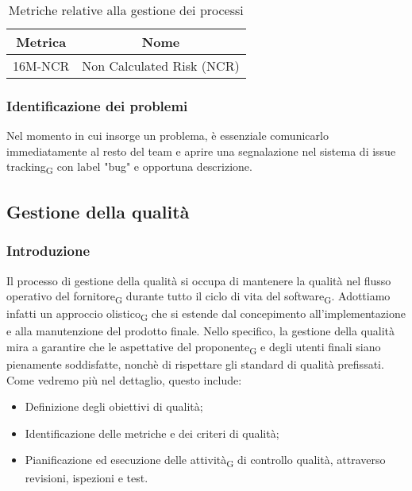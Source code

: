 \begin{table}[h] 
    \caption{Metriche relative alla gestione dei processi}
    \centering
    \begin{tabular}{|c|c|}
    \hline
    \textbf{Metrica} & \textbf{Nome} \\
    \hline
    16M-NCR & Non Calculated Risk (NCR) \\
    \hline
    \end{tabular}
\end{table}

\subsubsection{Identificazione dei problemi}
Nel momento in cui insorge un problema, è essenziale comunicarlo immediatamente al resto del team e aprire una segnalazione nel sistema di
{issue tracking\textsubscript{G}} con label "bug" e opportuna descrizione.

\subsection{Gestione della qualità}
\subsubsection{Introduzione}
Il processo di gestione della qualità si occupa di mantenere la qualità nel flusso operativo del {fornitore\textsubscript{G}}
durante tutto il ciclo di vita del {software\textsubscript{G}}. Adottiamo infatti un approccio 
{olistico\textsubscript{G}} che si estende dal concepimento all'implementazione e alla manutenzione del prodotto finale.
Nello specifico, la gestione della qualità mira a garantire che le aspettative del {proponente\textsubscript{G}} e 
degli utenti finali siano pienamente soddisfatte, nonchè di rispettare gli standard di qualità prefissati. Come vedremo più nel dettaglio,
questo include:
\begin{itemize}
    \item Definizione degli obiettivi di qualità;
    \item Identificazione delle metriche e dei criteri di qualità;
    \item Pianificazione ed esecuzione delle {attività\textsubscript{G}} di controllo qualità, attraverso revisioni, ispezioni e test.
\end{itemize}

